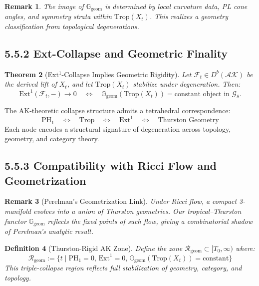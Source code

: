 \documentclass[11pt]{article}
\newtheorem{theorem}{Theorem}[section]
\newtheorem{definition}[theorem]{Definition}
\newtheorem{remark}[theorem]{Remark}
\begin{document}
\begin{remark}
The image of \( \mathbb{G}_\mathrm{geom} \) is determined by local curvature data, PL cone angles, and symmetry strata within \( \mathrm{Trop}(X_t) \). This realizes a geometry classification from topological degenerations.
\end{remark}

\subsection{5.5.2 Ext-Collapse and Geometric Finality}

\begin{theorem}[Ext$^1$-Collapse Implies Geometric Rigidity]
Let \( \mathcal{F}_t \in D^b(\mathcal{AK}) \) be the derived lift of \( X_t \), and let \( \mathrm{Trop}(X_t) \) stabilize under degeneration. Then:
\[
\mathrm{Ext}^1(\mathcal{F}_t, -) \to 0 \quad \Longleftrightarrow \quad \mathbb{G}_\mathrm{geom}(\mathrm{Trop}(X_t)) = \text{constant object in } \mathcal{G}_8.
\]
\end{theorem}

\begin{corollary}
The AK-theoretic collapse structure admits a tetrahedral correspondence:
\[
\mathrm{PH}_1 \quad \Longleftrightarrow \quad \mathrm{Trop} \quad \Longleftrightarrow \quad \mathrm{Ext}^1 \quad \Longleftrightarrow \quad \text{Thurston Geometry}
\]
Each node encodes a structural signature of degeneration across topology, geometry, and category theory.
\end{corollary}

\subsection{5.5.3 Compatibility with Ricci Flow and Geometrization}

\begin{remark}[Perelman's Geometrization Link]
Under Ricci flow, a compact 3-manifold evolves into a union of Thurston geometries. Our tropical–Thurston functor \( \mathbb{G}_\mathrm{geom} \) reflects the fixed points of such flow, giving a combinatorial shadow of Perelman's analytic result.
\end{remark}

\begin{definition}[Thurston-Rigid AK Zone]
Define the zone \( \mathcal{R}_\mathrm{geom} \subset [T_0, \infty) \) where:
\[
\mathcal{R}_\mathrm{geom} := \{ t \mid \mathrm{PH}_1 = 0,\, \mathrm{Ext}^1 = 0,\, \mathbb{G}_\mathrm{geom}(\mathrm{Trop}(X_t)) = \text{constant} \}
\]
This triple-collapse region reflects full stabilization of geometry, category, and topology.
\end{definition}
\end{document}

